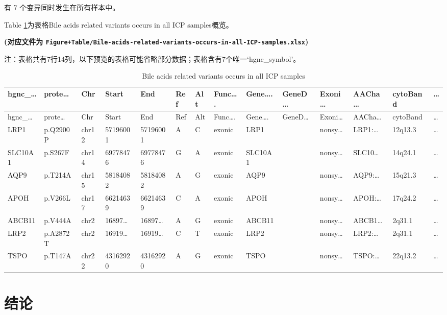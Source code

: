 \documentclass[
]{article}
\begin{document}
有 7 个变异同时发生在所有样本中。

Table \ref{tab:Bile-acids-related-variants-occurs-in-all-ICP-samples}为表格Bile acids related variants occurs in all ICP samples概览。

\textbf{(对应文件为 \texttt{Figure+Table/Bile-acids-related-variants-occurs-in-all-ICP-samples.xlsx})}

\begin{center}\begin{tcolorbox}[colback=gray!10, colframe=gray!50, width=0.9\linewidth, arc=1mm, boxrule=0.5pt]注：表格共有7行14列，以下预览的表格可能省略部分数据；表格含有7个唯一`hgnc\_symbol'。
\end{tcolorbox}
\end{center}

\begin{longtable}[]{@{}llllllllllllll@{}}
\caption{\label{tab:Bile-acids-related-variants-occurs-in-all-ICP-samples}Bile acids related variants occurs in all ICP samples}\tabularnewline
\toprule
hgnc\_\ldots{} & prote\ldots{} & Chr & Start & End & Ref & Alt & Func\ldots. & Gene\ldots. & GeneD\ldots{} & Exoni\ldots{} & AACha\ldots{} & cytoBand & \ldots{}\tabularnewline
\midrule
\endfirsthead
\toprule
hgnc\_\ldots{} & prote\ldots{} & Chr & Start & End & Ref & Alt & Func\ldots. & Gene\ldots. & GeneD\ldots{} & Exoni\ldots{} & AACha\ldots{} & cytoBand & \ldots{}\tabularnewline
\midrule
\endhead
LRP1 & p.Q2900P & chr12 & 57196001 & 57196001 & A & C & exonic & LRP1 & & nonsy\ldots{} & LRP1:\ldots{} & 12q13.3 & \ldots{}\tabularnewline
SLC10A1 & p.S267F & chr14 & 69778476 & 69778476 & G & A & exonic & SLC10A1 & & nonsy\ldots{} & SLC10\ldots{} & 14q24.1 & \ldots{}\tabularnewline
AQP9 & p.T214A & chr15 & 58184082 & 58184082 & A & G & exonic & AQP9 & & nonsy\ldots{} & AQP9:\ldots{} & 15q21.3 & \ldots{}\tabularnewline
APOH & p.V266L & chr17 & 66214639 & 66214639 & C & A & exonic & APOH & & nonsy\ldots{} & APOH:\ldots{} & 17q24.2 & \ldots{}\tabularnewline
ABCB11 & p.V444A & chr2 & 16897\ldots{} & 16897\ldots{} & A & G & exonic & ABCB11 & & nonsy\ldots{} & ABCB1\ldots{} & 2q31.1 & \ldots{}\tabularnewline
LRP2 & p.A2872T & chr2 & 16919\ldots{} & 16919\ldots{} & C & T & exonic & LRP2 & & nonsy\ldots{} & LRP2:\ldots{} & 2q31.1 & \ldots{}\tabularnewline
TSPO & p.T147A & chr22 & 43162920 & 43162920 & A & G & exonic & TSPO & & nonsy\ldots{} & TSPO:\ldots{} & 22q13.2 & \ldots{}\tabularnewline
\bottomrule
\end{longtable}

\hypertarget{dis}{%
\section{结论}\label{dis}}
\end{document}

